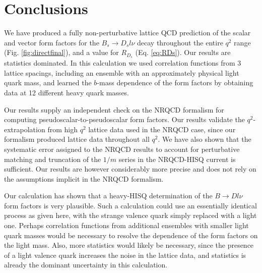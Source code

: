 
\section{Conclusions}
\label{sec:BsDs_conclusions}

We have produced a fully non-perturbative lattice QCD prediction of the scalar and vector form factors for the $B_s\to D_s l\nu$ decay throughout the entire $q^2$ range (Fig. \ref{fig:directfinal}), and a value for $R_{D_s}$ (Eq. \eqref{eq:RDs}). Our results are statistics dominated. In this calculation we used correlation functions from 3 lattice spacings, including an ensemble with an approximately physical light quark mass, and learned the $b$-mass dependence of the form factors by obtaining data at 12 different heavy quark masses.

Our results supply an independent check on the NRQCD formalism for computing pseudoscalar-to-pseudoscalar form factors. Our results validate the $q^2$-extrapolation from high $q^2$ lattice data used in the NRQCD case, since our formalism produced lattice data throughout all $q^2$. We have also shown that the systematic error assigned to the NRQCD results to account for perturbative matching and truncation of the $1/m$ series in the NRQCD-HISQ current is sufficient. Our results are however considerably more precise and does not rely on the assumptions implicit in the NRQCD formalism.

Our calculation has shown that a heavy-HISQ determination of the $B\to Dl\nu$ form factors is very plausible. Such a calculation could use an essentially identical process as given here, with the strange valence quark simply replaced with a light one. Perhaps correlation functions from additional ensembles with smaller light quark masses would be necessary to resolve the dependence of the form factors on the light mass. Also, more statistics would likely be necessary, since the presence of a light valence quark increases the noise in the lattice data, and statistics is already the dominant uncertainty in this calculation.


